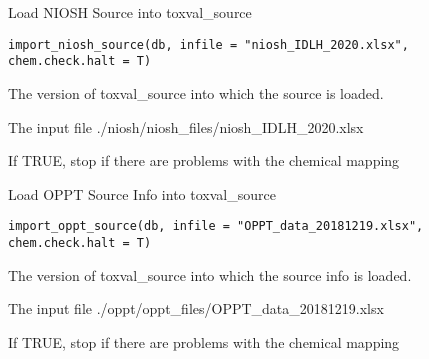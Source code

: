 \documentclass[letterpaper]{book}
\begin{document}
%
\begin{Description}\relax
Load NIOSH Source into toxval\_source
\end{Description}
%
\begin{Usage}
\begin{verbatim}
import_niosh_source(db, infile = "niosh_IDLH_2020.xlsx", chem.check.halt = T)
\end{verbatim}
\end{Usage}
%
\begin{Arguments}
\begin{ldescription}
\item[\code{db}] The version of toxval\_source into which the source is loaded.

\item[\code{infile}] The input file ./niosh/niosh\_files/niosh\_IDLH\_2020.xlsx

\item[\code{chem.check.halt}] If TRUE, stop if there are problems with the chemical mapping
\end{ldescription}
\end{Arguments}
%
\begin{Description}\relax
Load OPPT Source Info into toxval\_source
\end{Description}
%
\begin{Usage}
\begin{verbatim}
import_oppt_source(db, infile = "OPPT_data_20181219.xlsx", chem.check.halt = T)
\end{verbatim}
\end{Usage}
%
\begin{Arguments}
\begin{ldescription}
\item[\code{db}] The version of toxval\_source into which the source info is loaded.

\item[\code{infile}] The input file ./oppt/oppt\_files/OPPT\_data\_20181219.xlsx

\item[\code{chem.check.halt}] If TRUE, stop if there are problems with the chemical mapping
\end{ldescription}
\end{Arguments}
\end{document}
